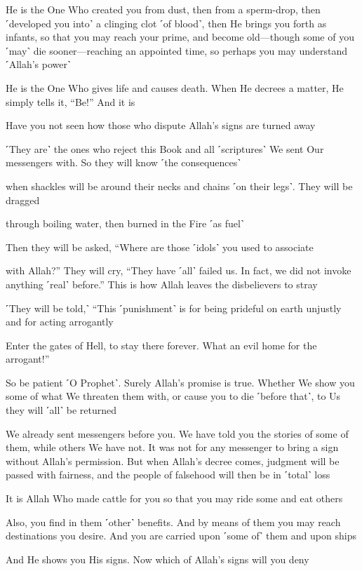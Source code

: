 He is the One Who created you from dust, then from a sperm-drop, then ˹developed you into˺ a clinging clot ˹of blood˺, then He brings you forth as infants, so that you may reach your prime, and become old—though some of you ˹may˺ die sooner—reaching an appointed time, so perhaps you may understand ˹Allah’s power˺

He is the One Who gives life and causes death. When He decrees a matter, He simply tells it, “Be!” And it is

Have you not seen how those who dispute Allah’s signs are turned away

˹They are˺ the ones who reject this Book and all ˹scriptures˺ We sent Our messengers with. So they will know ˹the consequences˺

when shackles will be around their necks and chains ˹on their legs˺. They will be dragged

through boiling water, then burned in the Fire ˹as fuel˺

Then they will be asked, “Where are those ˹idols˺ you used to associate

with Allah?” They will cry, “They have ˹all˺ failed us. In fact, we did not invoke anything ˹real˺ before.” This is how Allah leaves the disbelievers to stray

˹They will be told,˺ “This ˹punishment˺ is for being prideful on earth unjustly and for acting arrogantly

Enter the gates of Hell, to stay there forever. What an evil home for the arrogant!”

So be patient ˹O Prophet˺. Surely Allah’s promise is true. Whether We show you some of what We threaten them with, or cause you to die ˹before that˺, to Us they will ˹all˺ be returned

We already sent messengers before you. We have told you the stories of some of them, while others We have not. It was not for any messenger to bring a sign without Allah’s permission. But when Allah’s decree comes, judgment will be passed with fairness, and the people of falsehood will then be in ˹total˺ loss

It is Allah Who made cattle for you so that you may ride some and eat others

Also, you find in them ˹other˺ benefits. And by means of them you may reach destinations you desire. And you are carried upon ˹some of˺ them and upon ships

And He shows you His signs. Now which of Allah’s signs will you deny

